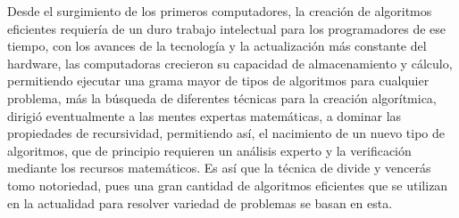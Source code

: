 Desde el surgimiento de los primeros computadores, la creación de algoritmos eficientes requiería de un duro trabajo intelectual para los programadores de ese tiempo, con los avances de la tecnología y la actualización más constante del hardware, las computadoras crecieron su capacidad de almacenamiento y cálculo, permitiendo ejecutar una grama mayor de tipos de algoritmos para cualquier problema, más la búsqueda de diferentes técnicas para la creación algorítmica, dirigió eventualmente a las mentes expertas matemáticas, a dominar las propiedades de recursividad, permitiendo así, el nacimiento de un nuevo tipo de algoritmos, que de principio requieren un análisis experto y la verificación mediante los recursos matemáticos. Es así que la técnica de divide y vencerás tomo notoriedad, pues una gran cantidad de algoritmos eficientes que se utilizan en la actualidad para resolver variedad de problemas se basan en esta.